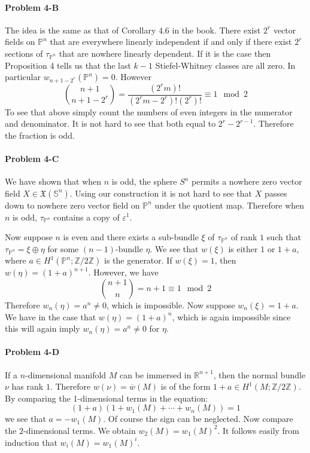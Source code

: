 \documentclass[12pt]{article}
\theoremstyle{plain}
\theoremstyle{definition}
\newcommand{\IP}{\mathbb{P}}
\newcommand{\IR}{\mathbb{R}}
\newcommand{\IS}{\mathbb{S}}
\newcommand{\IZ}{\mathbb{Z}}
\newcommand{\<}{\langle}
\renewcommand{\>}{\rangle}
\newcommand{\sm}{\varepsilon}
\begin{document}
\paragraph{Problem 4-B} The idea is the same as that of Corollary 4.6 in the book. There exist $2^r$ vector fields on $\IP^n$ that are everywhere linearly independent if and only if there exist $2^r$ sections of $\tau_{\IP^n}$ that are nowhere linearly dependent. If it is the case then Proposition 4 tells us that the last $ k - 1$ Stiefel-Whitney classes are all zero. In particular $ w_{n + 1 - 2^r} (\IP^n)= 0$. However 
$$ { n + 1 \choose n+1-2^r } = \frac{ (2^r m)! }{(2^r m - 2^r)! (2^r) !} \equiv 1 \mod 2 $$ 
To see that above simply count the numbers of even integers in the numerator and denominator. It is not hard to see that both equal to $2^r - 2^{r - 1}$. Therefore the fraction is odd.  

\paragraph{Problem 4-C}
We have shown that when $n$ is odd, the sphere $S^n$ permits a nowhere zero vector field $X \in \mathfrak{X}(\IS^n)$. Using our construction it is not hard to see that $X$ passes down to nowhere zero vector field on $\IP^n$ under the quotient map. Therefore when $n$ is odd, $\tau_{\IP^n}$ contains a copy of $\sm^1$. 

Now suppose $n$ is even and there exists a sub-bundle $\xi$ of $\tau_{\IP^n}$ of rank $1$ such that $\tau_{\IP^n} = \xi \oplus \eta$ for some $(n - 1)$-bundle $\eta$. We see that $w(\xi)$ is either $1$ or $1 + a$, where $a \in H^1(\IP^n; \IZ/2\IZ)$ is the generator. If $w(\xi) = 1$, then $w(\eta) = (1 + a)^{n + 1}$. However, we have 
$$ { n + 1 \choose n } = n + 1 \equiv 1 \mod 2 $$ Therefore $w_n (\eta) = a^n \neq 0$, which is impossible. Now suppose $w_n (\xi) = 1 + a$. We have in the case that $w(\eta) = (1 + a)^n$, which is again impossible since this will again imply $w_n(\eta) = a^n \neq 0$ for $\eta$. 


\paragraph{Problem 4-D} 
If a $n$-dimensional manifold $M$ can be immersed in $\IR^{n + 1}$, then the normal bundle $\nu$ has rank $1$. Therefore $w(\nu) = \overline{w}(M)$ is of the form $1 + a \in H^1(M; \IZ/2\IZ)$. By comparing the 1-dimensional terms in the equation:
$$ (1 + a)( 1 + w_1(M) + \cdots + w_n(M)) = 1$$
we see that $a = - w_1(M)$. Of course the sign can be neglected. Now compare the $2$-dimensional terms. We obtain $w_2(M) = w_1(M)^2$. It follows easily from induction that $w_i(M) = w_1(M)^i$. 
\end{document}
